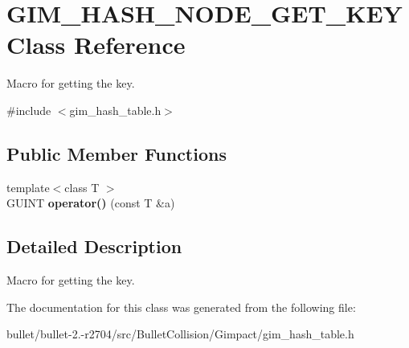 \hypertarget{class_g_i_m___h_a_s_h___n_o_d_e___g_e_t___k_e_y}{\section{G\+I\+M\+\_\+\+H\+A\+S\+H\+\_\+\+N\+O\+D\+E\+\_\+\+G\+E\+T\+\_\+\+K\+E\+Y Class Reference}
\label{class_g_i_m___h_a_s_h___n_o_d_e___g_e_t___k_e_y}
}


Macro for getting the key.  




{\ttfamily \#include $<$gim\+\_\+hash\+\_\+table.\+h$>$}

\subsection*{Public Member Functions}
\begin{DoxyCompactItemize}
\item 
\hypertarget{class_g_i_m___h_a_s_h___n_o_d_e___g_e_t___k_e_y_a811ed67fdb924c58ec519c9fb8bdbec9}{{\footnotesize template$<$class T $>$ }\\G\+U\+I\+N\+T {\bfseries operator()} (const T \&a)}\label{class_g_i_m___h_a_s_h___n_o_d_e___g_e_t___k_e_y_a811ed67fdb924c58ec519c9fb8bdbec9}

\end{DoxyCompactItemize}


\subsection{Detailed Description}
Macro for getting the key. 

The documentation for this class was generated from the following file\+:\begin{DoxyCompactItemize}
\item 
bullet/bullet-\/2.-\/r2704/src/\+Bullet\+Collision/\+Gimpact/gim\+\_\+hash\+\_\+table.\+h\end{DoxyCompactItemize}
